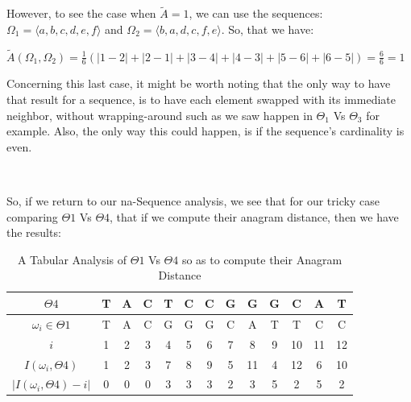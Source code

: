 \documentclass[a4paper, 18pt]{book} %
\begin{document}
\begin{center}
{\begin{minipage}{0.9\textwidth}
\begin{itemize}
{However, to see the case when $\tilde{A} = 1$, we can use the sequences: $\Omega_1 = \langle a, b, c, d, e, f \rangle$ and $\Omega_2 = \langle b, a, d, c, f, e \rangle$. So, that we have:

 $\tilde{A}(\Omega_1,\Omega_2) = \frac{1}{6}(|1-2|+|2-1|+|3-4|+|4-3|+|5-6|+|6-5|) = \frac{6}{6} = 1$
 
 Concerning this last case, it might be worth noting that the only way to have that result for a sequence, is to have each element swapped with its immediate neighbor, without wrapping-around such as we saw happen in $\Theta_1$ Vs $\Theta_3$ for example. Also, the only way this could happen, is if the sequence's cardinality is even.

}
\end{itemize}

\end{minipage}}
\\
\end{center}

So, if we return to our na-Sequence analysis, we see that for our tricky case comparing $\Theta1$ Vs $\Theta4$, that if we compute their anagram distance, then we have the results:

\begin{center}

\begin{table}[H]
\centering
\begin{tabular}[t]{|c||c|c|c|c|c|c|c|c|c|c|c|c|}
\hline
$\Theta4$ & T & A & C & T & C & C & G & G & G & C & A & T\\
\hline
$\omega_i \in \Theta1$ & T & A & C & G & G & G & C & A & T & T & C & C\\
\hline
$i$ & 1 & 2 & 3 & 4 & 5 & 6 & 7 & 8 & 9 & 10 & 11 & 12\\
\hline
$I(\omega_i,\Theta4)$ & 1 & 2 & 3 & 7 & 8 & 9 & 5 & 11 & 4 & 12 & 6 & 10\\
\hline
$|I(\omega_i,\Theta4) - i|$ & 0 & 0 & 0 & 3 & 3 & 3 & 2 & 3 & 5 & 2 & 5 & 2\\
\hline
\end{tabular}
\caption{A Tabular Analysis of $\Theta1$ Vs $\Theta4$ so as to compute their Anagram Distance}
\label{TABADM1}
\end{table}

\end{center}
\end{document}

